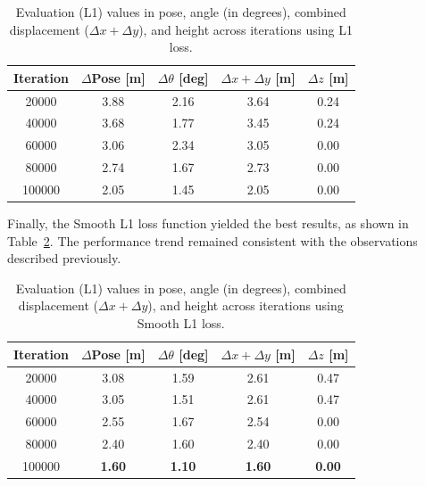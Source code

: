 \begin{table}[H]
    \centering
    \scriptsize
    \renewcommand{\arraystretch}{1.2} 
    \setlength{\tabcolsep}{10pt}
    \begin{tabular}{c c c c c}
        \toprule
        \textbf{Iteration} & \textbf{$\Delta$Pose [m]} & \textbf{$\Delta \theta$ [deg]} & \textbf{$\Delta x + \Delta y$ [m]} & \textbf{$\Delta z$ [m]} \\
        \midrule
        \num{20000}  & 3.88 & 2.16  & 3.64 & 0.24 \\
        \num{40000}  & 3.68 & 1.77  & 3.45 & 0.24 \\
        \num{60000}  & 3.06 & 2.34  & 3.05 & 0.00 \\
        \num{80000}  & 2.74 & 1.67  & 2.73 & 0.00 \\
        \num{100000} & 2.05 & 1.45  & 2.05 & 0.00 \\
        \bottomrule
    \end{tabular}
    \caption{Evaluation (L1) values in pose, angle (in degrees), combined displacement ($\Delta x + \Delta y$), and height across iterations using L1 loss.}
    \label{tab:pose_variations_deg_l1}
\end{table}

Finally, the Smooth L1 loss function yielded the best results, as shown in Table~\ref{tab:pose_variations_deg_l1s}. The performance trend remained consistent with the observations described previously.

\begin{table}[H]
    \centering
    \scriptsize
    \renewcommand{\arraystretch}{1.2} 
    \setlength{\tabcolsep}{10pt} 
    \begin{tabular}{c c c c c}
        \toprule
        \textbf{Iteration} & \textbf{$\Delta$Pose [m]} & \textbf{$\Delta \theta$ [deg]} & \textbf{$\Delta x + \Delta y$ [m]} & \textbf{$\Delta z$ [m]} \\
        \midrule
        \num{20000}  & 3.08 & 1.59  & 2.61 & 0.47 \\
        \num{40000}  & 3.05 & 1.51  & 2.61 & 0.47 \\
        \num{60000}  & 2.55 & 1.67  & 2.54 & 0.00 \\
        \num{80000}  & 2.40 & 1.60  & 2.40 & 0.00 \\
        \num{100000} & \textbf{1.60} & \textbf{1.10}  & \textbf{1.60} & \textbf{0.00} \\
        \bottomrule
    \end{tabular}
    \caption{Evaluation (L1) values in pose, angle (in degrees), combined displacement ($\Delta x + \Delta y$), and height across iterations using Smooth L1 loss.}
    \label{tab:pose_variations_deg_l1s}
\end{table}

